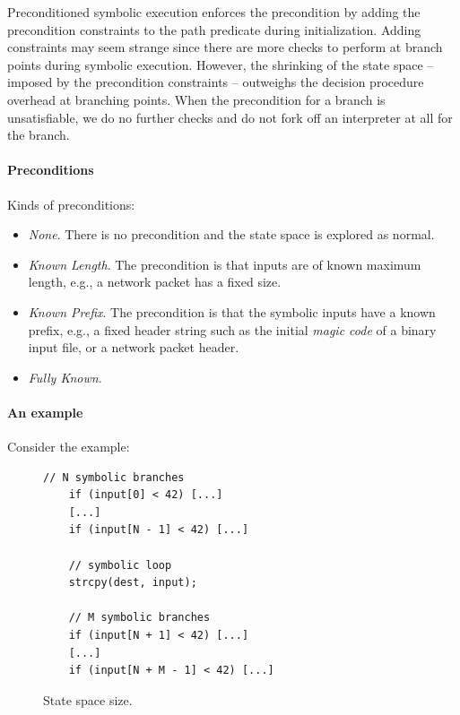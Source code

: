 Preconditioned symbolic execution enforces the precondition by adding the precondition constraints to the path predicate during initialization. Adding constraints may seem strange since there are more checks to perform at branch points during symbolic execution. However, the shrinking of the state space -- imposed by the precondition constraints -- outweighs the decision procedure overhead at branching points. When the precondition for a branch is unsatisfiable, we do no further checks and do not fork off an interpreter at all for the branch.%

\paragraph{Preconditions} Kinds of preconditions:
\begin{itemize}
\item {\em None}. There is no precondition and the state space is explored as normal.
\item {\em Known Length}. The precondition is that inputs are of known maximum length, e.g., a network packet has a fixed size.
\item {\em Known Prefix}. The precondition is that the symbolic inputs have a known prefix, e.g., a fixed header string such as the initial {\em magic code} of a binary input file, or a network packet header.
\item {\em Fully Known}. 
\end{itemize}

\paragraph{An example} Consider the example:

\begin{figure}[t]
\begin{small}
\begin{lstlisting}[basicstyle=\ttfamily\small]
    // N symbolic branches 
    if (input[0] < 42) [...]
    [...]
    if (input[N - 1] < 42) [...]

    // symbolic loop
    strcpy(dest, input); 

    // M symbolic branches
    if (input[N + 1] < 42) [...]
    [...]
    if (input[N + M - 1] < 42) [...]
\end{lstlisting}
\end{small}
\caption{State space size.}
\label{fig:state-space-size}
\end{figure}

